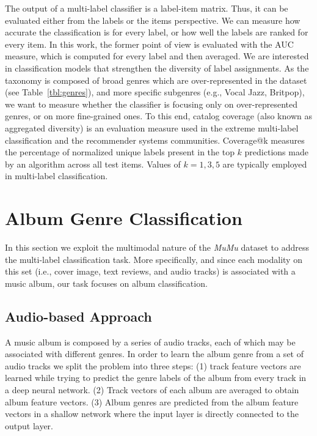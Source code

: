 \documentclass{article}
\begin{document}
The output of a multi-label classifier is a label-item matrix. 
Thus, it can be evaluated either from the labels or the items perspective. 
We can measure how accurate the classification is for every label, or how well the labels are ranked for every item. 
In this work, the former point of view is evaluated with the AUC measure, which is computed for every label and then averaged. 
We are interested in classification models that strengthen the diversity of label assignments. 
As the taxonomy is composed of broad genres which are over-represented in the dataset (see Table~\ref{tbl:genres}), and more specific subgenres (e.g., Vocal Jazz, Britpop), we want to measure whether the classifier is focusing only on over-represented genres, or on more fine-grained ones.
To this end, catalog coverage (also known as aggregated diversity) is an evaluation measure used in the extreme multi-label classification \cite{jain2016extreme} and the recommender systems \cite{oramas2016sound} communities. Coverage@k measures the percentage of normalized unique labels present in the top $k$ predictions made by an algorithm across all test items. Values of $k = 1, 3, 5$ are typically employed in multi-label classification.







\section{Album Genre Classification}\label{sec:classification}

In this section we exploit the multimodal nature of the \emph{MuMu} dataset to address the multi-label classification task.
More specifically, and since each modality on this set (i.e., cover image, text reviews, and audio tracks) is associated with a music album, our task focuses on album classification. 














\subsection{Audio-based Approach}\label{sec:audio}

A music album is composed by a series of audio tracks, each of which may be associated with different genres. In order to learn the album genre from a set of audio tracks we split the problem into three steps: (1) track feature vectors are learned while trying to predict the genre labels of the album from every track in a deep neural network. (2) Track vectors of each album are averaged to obtain album feature vectors.
(3) Album genres are predicted from the album feature vectors in a shallow network where the input layer is directly connected to the output layer.
\end{document}
